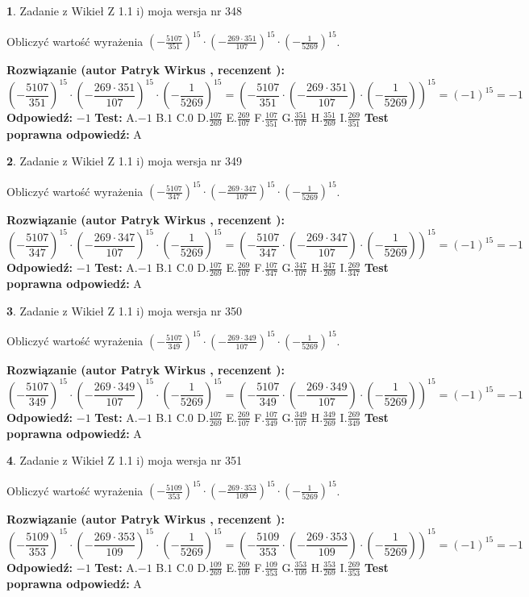 \documentclass[12pt, a4paper]{article}
\theoremstyle{definition} %
\newtheorem{zad}{}
\newcommand{\zadStart}[1]{\begin{zad}#1\newline}
\newcommand{\zadStop}{\end{zad}}
\newcommand{\rozwStart}[2]{\noindent \textbf{Rozwiązanie (autor #1 , recenzent #2): }\newline}
\newcommand{\rozwStop}{\newline}
\newcommand{\odpStart}{\noindent \textbf{Odpowiedź:}\newline}
\newcommand{\odpStop}{\newline}
\newcommand{\testStart}{\noindent \textbf{Test:}\newline}
\newcommand{\testStop}{\newline}
\newcommand{\kluczStart}{\noindent \textbf{Test poprawna odpowiedź:}\newline}
\newcommand{\kluczStop}{\newline}
\begin{document}
\zadStart{Zadanie z Wikieł Z 1.1 i) moja wersja nr 348}

Obliczyć wartość wyrażenia $(-\frac{5107}{351})^{15} \cdot (-\frac{269 \cdot 351}{107})^{15} \cdot (-\frac{1}{5269})^{15}$.
\zadStop
\rozwStart{Patryk Wirkus}{}
$$(-\frac{5107}{351})^{15} \cdot (-\frac{269 \cdot 351}{107})^{15} \cdot (-\frac{1}{5269})^{15} = (-\frac{5107}{351} \cdot (-\frac{269 \cdot 351}{107}) \cdot (-\frac{1}{5269}))^{15} = (-1)^{15} = -1$$
\rozwStop
\odpStart
$-1$
\odpStop
\testStart
A.$-1$ B.$1$ C.$0$ D.$\frac{107}{269}$ E.$\frac{269}{107}$
F.$\frac{107}{351}$ G.$\frac{351}{107}$
H.$\frac{351}{269}$
I.$\frac{269}{351}$
\testStop
\kluczStart
A
\kluczStop



\zadStart{Zadanie z Wikieł Z 1.1 i) moja wersja nr 349}

Obliczyć wartość wyrażenia $(-\frac{5107}{347})^{15} \cdot (-\frac{269 \cdot 347}{107})^{15} \cdot (-\frac{1}{5269})^{15}$.
\zadStop
\rozwStart{Patryk Wirkus}{}
$$(-\frac{5107}{347})^{15} \cdot (-\frac{269 \cdot 347}{107})^{15} \cdot (-\frac{1}{5269})^{15} = (-\frac{5107}{347} \cdot (-\frac{269 \cdot 347}{107}) \cdot (-\frac{1}{5269}))^{15} = (-1)^{15} = -1$$
\rozwStop
\odpStart
$-1$
\odpStop
\testStart
A.$-1$ B.$1$ C.$0$ D.$\frac{107}{269}$ E.$\frac{269}{107}$
F.$\frac{107}{347}$ G.$\frac{347}{107}$
H.$\frac{347}{269}$
I.$\frac{269}{347}$
\testStop
\kluczStart
A
\kluczStop



\zadStart{Zadanie z Wikieł Z 1.1 i) moja wersja nr 350}

Obliczyć wartość wyrażenia $(-\frac{5107}{349})^{15} \cdot (-\frac{269 \cdot 349}{107})^{15} \cdot (-\frac{1}{5269})^{15}$.
\zadStop
\rozwStart{Patryk Wirkus}{}
$$(-\frac{5107}{349})^{15} \cdot (-\frac{269 \cdot 349}{107})^{15} \cdot (-\frac{1}{5269})^{15} = (-\frac{5107}{349} \cdot (-\frac{269 \cdot 349}{107}) \cdot (-\frac{1}{5269}))^{15} = (-1)^{15} = -1$$
\rozwStop
\odpStart
$-1$
\odpStop
\testStart
A.$-1$ B.$1$ C.$0$ D.$\frac{107}{269}$ E.$\frac{269}{107}$
F.$\frac{107}{349}$ G.$\frac{349}{107}$
H.$\frac{349}{269}$
I.$\frac{269}{349}$
\testStop
\kluczStart
A
\kluczStop



\zadStart{Zadanie z Wikieł Z 1.1 i) moja wersja nr 351}

Obliczyć wartość wyrażenia $(-\frac{5109}{353})^{15} \cdot (-\frac{269 \cdot 353}{109})^{15} \cdot (-\frac{1}{5269})^{15}$.
\zadStop
\rozwStart{Patryk Wirkus}{}
$$(-\frac{5109}{353})^{15} \cdot (-\frac{269 \cdot 353}{109})^{15} \cdot (-\frac{1}{5269})^{15} = (-\frac{5109}{353} \cdot (-\frac{269 \cdot 353}{109}) \cdot (-\frac{1}{5269}))^{15} = (-1)^{15} = -1$$
\rozwStop
\odpStart
$-1$
\odpStop
\testStart
A.$-1$ B.$1$ C.$0$ D.$\frac{109}{269}$ E.$\frac{269}{109}$
F.$\frac{109}{353}$ G.$\frac{353}{109}$
H.$\frac{353}{269}$
I.$\frac{269}{353}$
\testStop
\kluczStart
A
\kluczStop
\end{document}
